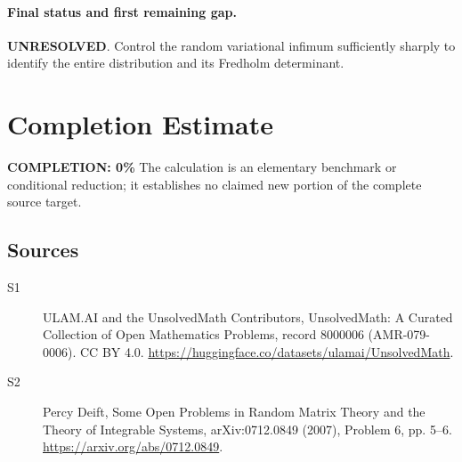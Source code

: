 \documentclass[11pt]{article}
\begin{document}
\paragraph{Final status and first remaining gap.}
\textbf{UNRESOLVED}. Control the random variational infimum sufficiently sharply to identify the entire distribution and its Fredholm determinant.

\section{Completion Estimate}
\noindent\textbf{COMPLETION: 0\%}
The calculation is an elementary benchmark or conditional reduction; it establishes no claimed new portion of the complete source target.

\subsection{Sources}
\begin{description}
\item[\hypertarget{source:8000006:1}{S1}] ULAM.AI and the UnsolvedMath Contributors, UnsolvedMath: A Curated Collection of Open Mathematics Problems, record 8000006 (AMR-079-0006). CC BY 4.0. \url{https://huggingface.co/datasets/ulamai/UnsolvedMath}.
\item[\hypertarget{source:8000006:2}{S2}] Percy Deift, Some Open Problems in Random Matrix Theory and the Theory of Integrable Systems, arXiv:0712.0849 (2007), Problem 6, pp. 5--6. \url{https://arxiv.org/abs/0712.0849}.
\end{description}
\label{end:8000006}
\end{document}
